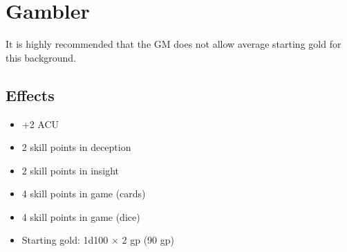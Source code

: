 \section{Gambler}\label{background:gambler}
It is highly recommended that the GM does not allow average starting gold for
this background.

\subsection{Effects}
\begin{itemize}
    \item +2 ACU
    \item 2 skill points in deception
    \item 2 skill points in insight
    \item 4 skill points in game (cards)
    \item 4 skill points in game (dice)
    \item Starting gold: 1d100 $\times$ 2 gp (90 gp)
\end{itemize}
